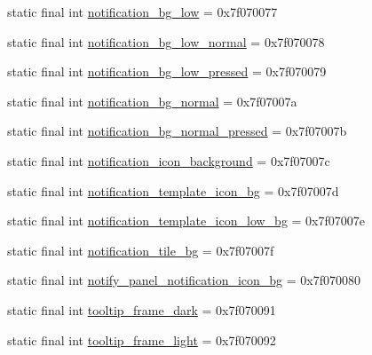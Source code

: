 \begin{DoxyCompactItemize}
\item 
static final int \mbox{\hyperlink{classandroid_1_1support_1_1v7_1_1appcompat_1_1_r_1_1drawable_a353cdafefc3107597d0db87596e73921}{notification\+\_\+bg\+\_\+low}} = 0x7f070077
\item 
static final int \mbox{\hyperlink{classandroid_1_1support_1_1v7_1_1appcompat_1_1_r_1_1drawable_a79aab8d64db424afe8354efa6ef5c26a}{notification\+\_\+bg\+\_\+low\+\_\+normal}} = 0x7f070078
\item 
static final int \mbox{\hyperlink{classandroid_1_1support_1_1v7_1_1appcompat_1_1_r_1_1drawable_a914244aa736aa82551d943d49ecb231f}{notification\+\_\+bg\+\_\+low\+\_\+pressed}} = 0x7f070079
\item 
static final int \mbox{\hyperlink{classandroid_1_1support_1_1v7_1_1appcompat_1_1_r_1_1drawable_aca8ae4ace4f935b5e62999e5db787423}{notification\+\_\+bg\+\_\+normal}} = 0x7f07007a
\item 
static final int \mbox{\hyperlink{classandroid_1_1support_1_1v7_1_1appcompat_1_1_r_1_1drawable_ae4a93571a6bb07a75968c7a614532460}{notification\+\_\+bg\+\_\+normal\+\_\+pressed}} = 0x7f07007b
\item 
static final int \mbox{\hyperlink{classandroid_1_1support_1_1v7_1_1appcompat_1_1_r_1_1drawable_ac0ba483c1471e616dfdfc59676d504b7}{notification\+\_\+icon\+\_\+background}} = 0x7f07007c
\item 
static final int \mbox{\hyperlink{classandroid_1_1support_1_1v7_1_1appcompat_1_1_r_1_1drawable_a418857631140eaea9a0ba11fa60ab72e}{notification\+\_\+template\+\_\+icon\+\_\+bg}} = 0x7f07007d
\item 
static final int \mbox{\hyperlink{classandroid_1_1support_1_1v7_1_1appcompat_1_1_r_1_1drawable_a3854c021d5f0768bf8781b5e424e78e4}{notification\+\_\+template\+\_\+icon\+\_\+low\+\_\+bg}} = 0x7f07007e
\item 
static final int \mbox{\hyperlink{classandroid_1_1support_1_1v7_1_1appcompat_1_1_r_1_1drawable_a27e0dd01a8a504f46a6d181b3a3d8eb4}{notification\+\_\+tile\+\_\+bg}} = 0x7f07007f
\item 
static final int \mbox{\hyperlink{classandroid_1_1support_1_1v7_1_1appcompat_1_1_r_1_1drawable_ad5705d42ed3ba126974cc60a647f361c}{notify\+\_\+panel\+\_\+notification\+\_\+icon\+\_\+bg}} = 0x7f070080
\item 
static final int \mbox{\hyperlink{classandroid_1_1support_1_1v7_1_1appcompat_1_1_r_1_1drawable_a5e1e725970e14ba17cf3ba19a4fccdc9}{tooltip\+\_\+frame\+\_\+dark}} = 0x7f070091
\item 
static final int \mbox{\hyperlink{classandroid_1_1support_1_1v7_1_1appcompat_1_1_r_1_1drawable_a0f8038bc0517156c3d94469744a30f8a}{tooltip\+\_\+frame\+\_\+light}} = 0x7f070092
\end{DoxyCompactItemize}
